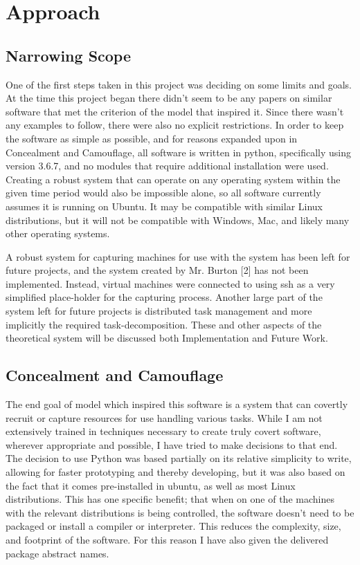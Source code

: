 \section{Approach}
\subsection{Narrowing Scope}
One of the first steps taken in this project was deciding on some limits and goals. At the time this project began there didn't seem to be any papers on similar software that met the criterion of the model that inspired it. Since there wasn’t any examples to follow, there were also no explicit restrictions. In order to keep the software as simple as possible, and for reasons expanded upon in Concealment and Camouflage, all software is written in python, specifically using version 3.6.7, and no modules that require additional installation were used. Creating a robust system that can operate on any operating system within the given time period would also be impossible alone, so all software currently assumes it is running on Ubuntu. It may be compatible with similar Linux distributions, but it will not be compatible with Windows, Mac, and likely many other operating systems.


A robust system for capturing machines for use with the system has been left for future projects, and the system created by Mr. Burton [2] has not been implemented. Instead, virtual machines were connected to using ssh as a very simplified place-holder for the capturing process. Another large part of the system left for future projects is distributed task management and more implicitly the required task-decomposition. These and other aspects of the theoretical system will be discussed both Implementation and Future Work.
\subsection{Concealment and Camouflage}
The end goal of model which inspired this software is a system that can covertly recruit or capture resources for use handling various tasks. While I am not extensively trained in techniques necessary to create truly covert software, wherever appropriate and possible, I have tried to make decisions to that end. The decision to use Python was based partially on its relative simplicity to write, allowing for faster prototyping and thereby developing, but it was also based on the fact that it comes pre-installed in ubuntu, as well as most Linux distributions. This has one specific benefit; that when on one of the machines with the relevant distributions is being controlled, the software doesn't need to be packaged or install a compiler or interpreter. This reduces the complexity, size, and footprint of the software. For this reason I have also given the delivered package abstract names.


